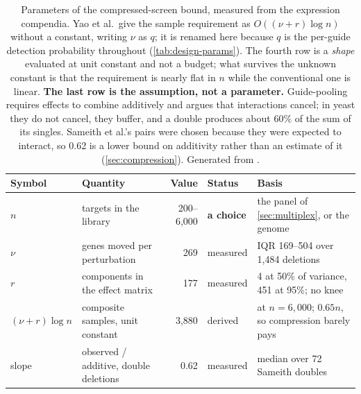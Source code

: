 \begin{table}[htbp]\centering
\footnotesize
\caption[]{Parameters of the compressed-screen bound, measured from the expression compendia. Yao et al.\ give the sample requirement as $O((\nu+r)\log n)$ without a constant, writing $\nu$ as $q$; it is renamed here because $q$ is the per-guide detection probability throughout (\cref{tab:design-params}). The fourth row is a \emph{shape} evaluated at unit constant and not a budget; what survives the unknown constant is that the requirement is nearly flat in $n$ while the conventional one is linear. \textbf{The last row is the assumption, not a parameter.} Guide-pooling requires effects to combine additively and argues that interactions cancel; in yeast they do not cancel, they buffer, and a double produces about 60\% of the sum of its singles. Sameith et al.'s pairs were chosen because they were expected to interact, so 0.62 is a lower bound on additivity rather than an estimate of it (\cref{sec:compression}). Generated from .}\label{tab:compression-params}
\begin{tabular}{llrll}
\toprule
Symbol & Quantity & Value & Status & Basis \\
\midrule
$n$ & targets in the library & 200--6{,}000 & \textbf{a choice} & the panel of \cref{sec:multiplex}, or the genome \\
$\nu$ & genes moved per perturbation & 269 & measured & IQR 169--504 over 1{,}484 deletions \\
$r$ & components in the effect matrix & 177 & measured & 4 at 50\% of variance, 451 at 95\%; no knee \\
$(\nu{+}r)\log n$ & composite samples, unit constant & 3{,}880 & derived & at $n=6{,}000$; $0.65n$, so compression barely pays \\
slope & observed / additive, double deletions & 0.62 & measured & median over 72 Sameith doubles \\
\bottomrule
\end{tabular}
\end{table}
